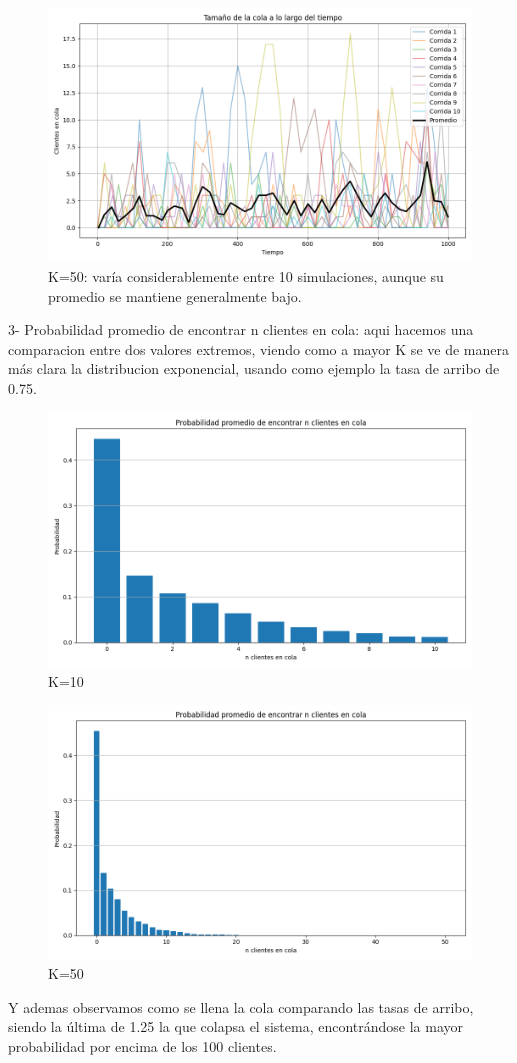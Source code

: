 \documentclass{article}
\begin{document}
\begin{figure}
    \centering
    \includegraphics[width=0.5\linewidth]{Imagenes/MM1/cola_vs_tiempo_0.75_K50.png}
    \caption{K=50: varía considerablemente entre 10 simulaciones, aunque su promedio se mantiene generalmente bajo.}
    \label{fig:enter-label}
\end{figure}
\FloatBarrier

3- Probabilidad promedio de encontrar n clientes en cola: aqui hacemos una comparacion entre dos valores extremos, viendo como a mayor K se ve de manera más clara la distribucion exponencial, usando como ejemplo la tasa de arribo de 0.75.
\begin{figure}
    \centering
    \includegraphics[width=0.5\linewidth]{Imagenes/MM1/prob_n_clientes_0.75_K10.png}
    \caption{K=10}
    \label{fig:enter-label}
\end{figure}
\begin{figure}
    \centering
    \includegraphics[width=0.5\linewidth]{Imagenes/MM1/prob_n_clientes_0.75_K50.png}
    \caption{K=50}
    \label{fig:enter-label}
\end{figure}
\FloatBarrier
Y ademas observamos como se llena la cola comparando las tasas de arribo, siendo la última de 1.25 la que colapsa el sistema, encontrándose la mayor probabilidad por encima de los 100 clientes.
\end{document}
